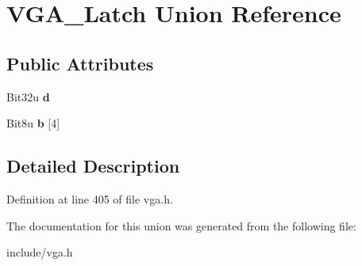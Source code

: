 \hypertarget{unionVGA__Latch}{\section{V\-G\-A\-\_\-\-Latch Union Reference}
\label{unionVGA__Latch}
}
\subsection*{Public Attributes}
\begin{DoxyCompactItemize}
\item 
\hypertarget{unionVGA__Latch_a68ae346aa35c3835ad2b7c988e9b53e6}{Bit32u {\bfseries d}}\label{unionVGA__Latch_a68ae346aa35c3835ad2b7c988e9b53e6}

\item 
\hypertarget{unionVGA__Latch_a2c3c0ab6db68a5db80e2f71639b089e1}{Bit8u {\bfseries b} \mbox{[}4\mbox{]}}\label{unionVGA__Latch_a2c3c0ab6db68a5db80e2f71639b089e1}

\end{DoxyCompactItemize}


\subsection{Detailed Description}


Definition at line 405 of file vga.\-h.



The documentation for this union was generated from the following file\-:\begin{DoxyCompactItemize}
\item 
include/vga.\-h\end{DoxyCompactItemize}
